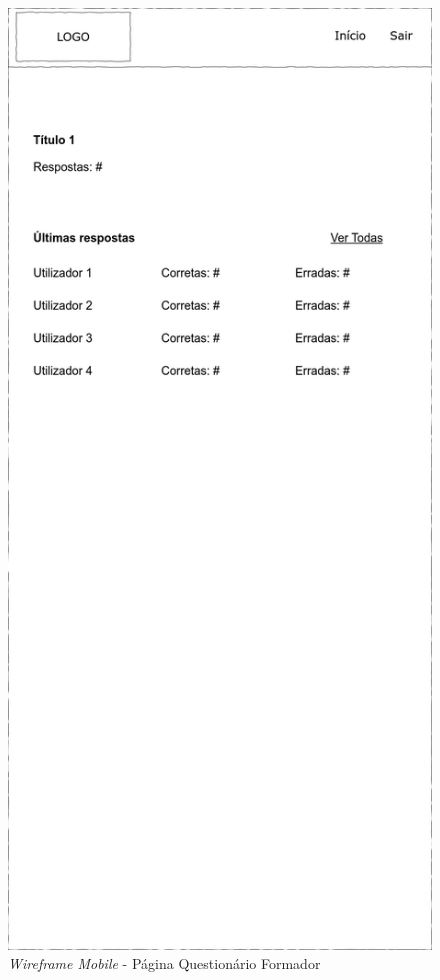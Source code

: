 \documentclass[12pt,a4paper,final]{article}
\begin{document}
    \begin{figure}[H]
        \centering
        \includegraphics[width=\textwidth,height=0.9\textheight,keepaspectratio]{wireframes/questionarios.wireframes-formador-questionario-mobile.drawio}
        \caption{\textit{Wireframe Mobile} - Página Questionário Formador}
        \label{fig:wm-pqf}
    \end{figure}
\end{document}
